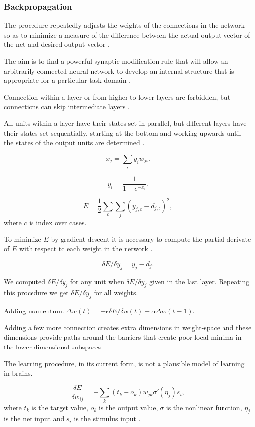 
\subsubsection{Backpropagation}

The procedure repeatedly adjusts the weights of the connections in the network so as to minimize a measure of the difference between the actual output vector of the net and desired output vector \cite{rumelhart1986learning}. 

The aim is to find a powerful synaptic modification rule that will allow an arbitrarily connected neural network to develop an internal structure that is appropriate for a particular task domain \cite{rumelhart1986learning}. 

Connection within a layer or from higher to lower layers are forbidden, but connections can skip intermediate layers \cite{rumelhart1986learning}.

All units within a layer have their states set in parallel, but different layers have their states set sequentially, starting at the bottom and working upwards until the states of the output units are determined \cite{rumelhart1986learning}. 

$$x_j = \sum_i y_iw_{ji}.$$

$$y_i = \frac{1}{1 + e^{-x_i}}.$$

$$E = \frac{1}{2} \sum_c \sum_j (y_{j,c} - d_{j,c})^2,$$
where $c$ is index over cases. 

To minimize $E$ by gradient descent it is necessary to compute the partial derivate of $E$ with respect to each weight in the network \cite{rumelhart1986learning}. 

$$\delta E / \delta y_j = y_j - d_j.$$

We computed $\delta E / \delta y_j$ for any unit when $\delta E / \delta y_j$ given in the last layer. Repeating this procedure we get $\delta E / \delta y_j$ for all weights. 

Adding momentum:
$\Delta w(t) = -\epsilon \delta E/ \delta w(t) + \alpha \Delta w(t-1).$

Adding a few more connection creates extra dimensions in weight-space and these dimensions provide paths around the barriers that create poor local minima in the lower dimensional subspaces \cite{rumelhart1986learning}. 

The learning procedure, in its current form, is not a plausible model of learning in brains. 

$$\frac{\delta E}{\delta w_{ij}} = -\sum_k(t_k-o_k)w_{jk}\sigma'(\eta_j)s_i,$$
where $t_k$ is the target value, $o_k$ is the output value, $\sigma$ is the nonlinear function, $\eta_j$ is the net input and $s_i$ is the stimulus input \cite{o1996bio}.
